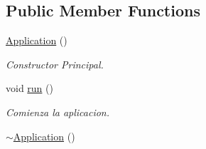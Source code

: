 \subsection*{Public Member Functions}
\begin{DoxyCompactItemize}
\item 
\hyperlink{classant_1_1_application_afaff8830dce721acf4d6924a2a0e08f2}{Application} ()
\begin{DoxyCompactList}\small\item\em Constructor Principal. \end{DoxyCompactList}\item 
void \hyperlink{classant_1_1_application_a98b4cb1093562a39e0c95309cec18c48}{run} ()
\begin{DoxyCompactList}\small\item\em Comienza la aplicacion. \end{DoxyCompactList}\item 
\hyperlink{classant_1_1_application_abca39610feae0ca562cba54bbcf9e11f}{$\sim$\+Application} ()
\end{DoxyCompactItemize}
